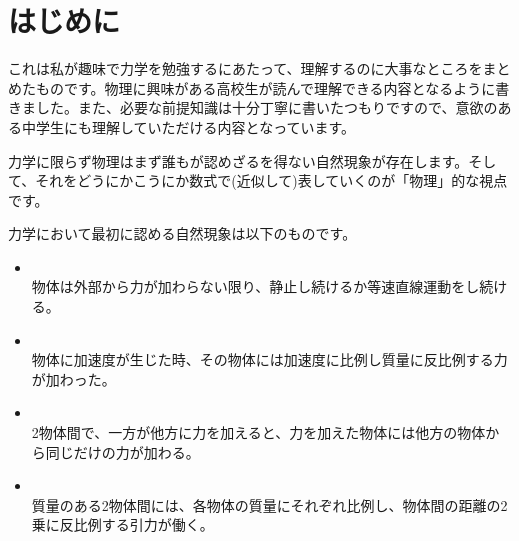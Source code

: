 \chapter{はじめに}
これは私が趣味で力学を勉強するにあたって、理解するのに大事なところをまとめたものです。物理に興味がある高校生が読んで理解できる内容となるように書きました。また、必要な前提知識は十分丁寧に書いたつもりですので、意欲のある中学生にも理解していただける内容となっています。

力学に限らず物理はまず誰もが認めざるを得ない自然現象が存在します。そして、それをどうにかこうにか数式で(近似して)表していくのが「物理」的な視点です。

力学において最初に認める自然現象は以下のものです。

\begin{itemize}
    \item {}\\
        物体は外部から力が加わらない限り、静止し続けるか等速直線運動をし続ける。
    \item {}\\
        物体に加速度が生じた時、その物体には加速度に比例し質量に反比例する力が加わった。
    \item {}\\
        2物体間で、一方が他方に力を加えると、力を加えた物体には他方の物体から同じだけの力が加わる。
    \item {}\\
        質量のある2物体間には、各物体の質量にそれぞれ比例し、物体間の距離の2乗に反比例する引力が働く。
\end{itemize}

\clearpage